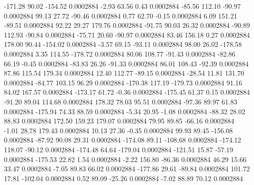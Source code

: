      -171.28       90.02     -154.52     0.0002884
       -2.93       63.56        0.43     0.0002884
      -85.56      112.10      -90.97     0.0002884
       99.13       27.72      -90.46     0.0002884
        0.77       62.70       -0.15     0.0002884
        6.09      151.21      -89.51     0.0002884
       92.22       29.27      179.76     0.0002884
      -91.75       90.03       26.32     0.0002884
      -90.89      112.93      -90.84     0.0002884
      -75.71       20.60      -90.97     0.0002884
       83.46      156.18        0.27     0.0002884
      178.00       90.44     -154.02     0.0002884
       -3.57       69.15      -93.11     0.0002884
       98.00       26.02     -178.58     0.0002884
        3.35      114.55     -178.72     0.0002884
       80.06      108.77      -91.43     0.0002884
      -82.86       66.19       -0.45     0.0002884
      -83.83       26.26      -91.33     0.0002884
       86.01      108.43      -92.39     0.0002884
       87.86      115.54      179.34     0.0002884
       12.40      112.77      -89.15     0.0002884
      -28.54       11.81      131.70     0.0002884
      -84.77      103.15       96.29     0.0002884
     -170.38      117.19     -179.73     0.0002884
       91.16       84.02      167.57     0.0002884
     -173.17       61.72       -0.36     0.0002884
     -175.45       61.37        0.15     0.0002884
      -91.20       89.04      114.68     0.0002884
      178.32       78.03       95.51     0.0002884
      -97.36       89.97       61.83     0.0002884
     -175.94       74.33       88.59     0.0002884
       -5.34       20.95       -1.08     0.0002884
      -88.32       28.02       88.83     0.0002884
      172.50      159.23      179.07     0.0002884
       79.95       89.85      -66.16     0.0002884
       -1.01       28.78      179.43     0.0002884
       10.13       27.36       -0.35     0.0002884
       99.93       89.45     -156.08     0.0002884
      -87.92       90.08       29.31     0.0002884
     -174.08       89.11     -108.68     0.0002884
     -174.12      118.07      -90.12     0.0002884
     -174.48       64.64     -179.04     0.0002884
     -121.51       15.87      -57.19     0.0002884
     -175.53       22.82        1.54     0.0002884
       -2.22      156.80      -86.36     0.0002884
       46.29       15.66       33.47     0.0002884
       -7.05       89.83       66.02     0.0002884
     -177.86       29.61      -89.84     0.0002884
      101.72       17.81     -102.04     0.0002884
        0.52       89.09      -25.26     0.0002884
       -7.02       88.89       70.12     0.0002884
